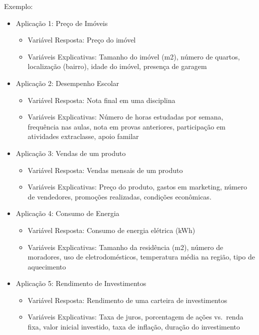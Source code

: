 \documentclass[
]{article}
\providecommand{\tightlist}{%
  \setlength{\itemsep}{0pt}\setlength{\parskip}{0pt}}
\begin{document}
Exemplo:

\begin{itemize}
\tightlist
\item
  Aplicação 1: Preço de Imóveis

  \begin{itemize}
  \tightlist
  \item
    Variável Resposta: Preço do imóvel
  \item
    Variáveis Explicativas: Tamanho do imóvel (m2), número de quartos,
    localização (bairro), idade do imóvel, presença de garagem
  \end{itemize}
\item
  Aplicação 2: Desempenho Escolar

  \begin{itemize}
  \tightlist
  \item
    Variável Resposta: Nota final em uma disciplina
  \item
    Variáveis Explicativas: Número de horas estudadas por semana,
    frequência nas aulas, nota em provas anteriores, participação em
    atividades extraclasse, apoio familar
  \end{itemize}
\item
  Aplicação 3: Vendas de um produto

  \begin{itemize}
  \tightlist
  \item
    Variável Resposta: Vendas mensais de um produto
  \item
    Variáveis Explicativas: Preço do produto, gastos em marketing,
    número de vendedores, promoções realizadas, condições econômicas.
  \end{itemize}
\item
  Aplicação 4: Consumo de Energia

  \begin{itemize}
  \tightlist
  \item
    Variável Resposta: Consumo de energia elétrica (kWh)
  \item
    Variáveis Explicativas: Tamanho da residência (m2), número de
    moradores, uso de eletrodomésticos, temperatura média na região,
    tipo de aquecimento
  \end{itemize}
\item
  Aplicação 5: Rendimento de Investimentos

  \begin{itemize}
  \tightlist
  \item
    Variável Resposta: Rendimento de uma carteira de investimentos
  \item
    Variáveis Explicativas: Taxa de juros, porcentagem de ações
    vs.~renda fixa, valor inicial investido, taxa de inflação, duração
    do investimento
  \end{itemize}
\end{itemize}
\end{document}
